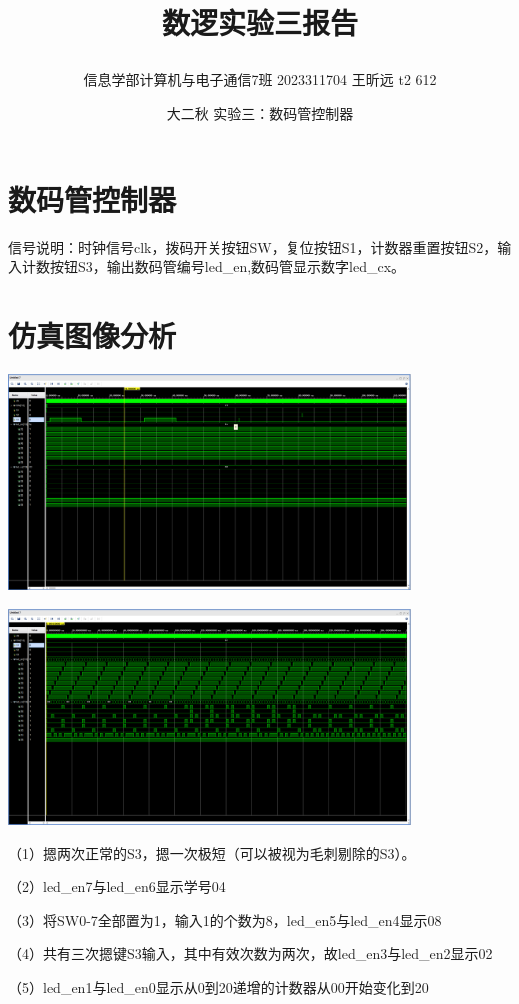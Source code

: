\documentclass{article} %
\begin{document}
    \title{\centerline{数逻实验三报告}}
    \date{大二秋 实验三：数码管控制器}
    \author{信息学部计算机与电子通信7班 2023311704 王昕远 t2 612}
    \maketitle
    \thispagestyle{empty}


\section{数码管控制器}

信号说明：时钟信号clk，拨码开关按钮SW，复位按钮S1，计数器重置按钮S2，输入计数按钮S3，输出数码管编号led\_en,数码管显示数字led\_cx。\par

\section{仿真图像分析}
\includegraphics[width=0.8\textwidth]{sim2.png}\par
\includegraphics[width=0.8\textwidth]{sim1.png}\par
（1）摁两次正常的S3，摁一次极短（可以被视为毛刺剔除的S3）。\par
（2）led\_en7与led\_en6显示学号04\par
（3）将SW0-7全部置为1，输入1的个数为8，led\_en5与led\_en4显示08\par
（4）共有三次摁键S3输入，其中有效次数为两次，故led\_en3与led\_en2显示02\par
（5）led\_en1与led\_en0显示从0到20递增的计数器从00开始变化到20\par
\end{document}
